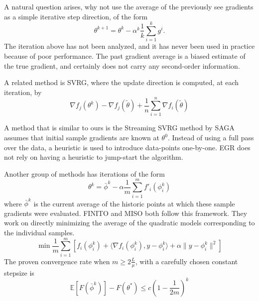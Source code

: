 \documentclass[11pt]{article}
\begin{document}
A natural question arises, why not use the average of the previously see gradients as a simple iterative step direction, of the form
\[ \theta^{k+1} = \theta^k- \alpha^k \frac{1}{k}\sum_{i=1}^{k}g^i . \]
The iteration above has not been analyzed, and it has never been used in practice because of poor performance. The past gradient average is a biased estimate of the true gradient, and certainly does not carry any second-order information.


%



A related method is SVRG, where the update direction is computed, at each iteration, by
\[ \nabla f_j(\theta^k) -  \nabla f_j(\tilde{\theta}) + \frac{1}{n}\sum_{i=1}^{n}  \nabla f_i (\tilde{\theta})\]

A method that is similar to ours is the Streaming SVRG method by 
SAGA assumes that initial sample gradients are known at $\theta^0$. Instead of using a full pass over the data, a heuristic is used to introduce data-points one-by-one. EGR does not rely on having a heuristic to jump-start the algorithm.

Another group of methods has iterations of the form
\begin{equation}
	\theta^k = \bar{\phi}^{k} - \alpha \frac{1}{m} \sum_{i=1}^{m} f'_i(\phi_i^k)
\end{equation}
where $\bar{\phi}^{k}$ is the current average of the historic points at which these sample gradients were evaluated. FINITO and MISO both follow this framework. They work on directly minimizing the average of the quadratic models corresponding to the individual samples. 
\begin{equation}
	\min \frac{1}{m} \sum_{i=1}^{m} \left[ f_i(\phi_i^k) + \langle \nabla f_i(\phi_i^k),y- \phi_i^k  \rangle + \alpha \|y-\phi_i^k  \|^2 \right]
\end{equation}
The proven convergence rate when $m \geq 2 \frac{L}{\mu}$, with a carefully chosen constant stepsize is 
\begin{equation}
	\mathbb{E} [F(\bar{\phi}^{k}) ] - F(\theta^*) \leq c \left( 1- \frac{1}{2m }\right)^k 
\end{equation}
\end{document}
